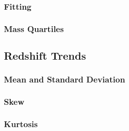 \subsubsection{Fitting}
\label{subsubsec:fitting}



\subsubsection{Mass Quartiles}
\label{subsubsec:mass_quartiles}




\subsection{Redshift Trends}
\label{subsec:redshift_trends}



\subsubsection{Mean and Standard Deviation}
\label{subsubsec:mean_stdev}



\subsubsection{Skew}
\label{subsubsec:skew}



\subsubsection{Kurtosis}
\label{subsubsec:kurtosis}




